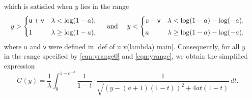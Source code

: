 \documentclass{amsart}
\theoremstyle{plain}
\theoremstyle{remark}
\numberwithin{equation}{section}
\begin{document}
which is satisfied when $y$ lies in the range
\begin{equation}\label{eqn:yrange}
    y>
    \begin{cases}
        \mathsf u+\mathsf v &\lambda<\log(1-a), 
        \smallskip 
        \\    
        1&\lambda\geq\log(1-a), 
    \end{cases} \quad \textup{ and } \quad  y<
    \begin{cases}
        \mathsf u- \mathsf v&\lambda<\log(1-a)-\log(-a), 
          \smallskip 
        \\
        a&\lambda\geq \log(1-a)-\log(-a), 
    \end{cases} 
\end{equation} 
where $\mathsf{u}$ and $\mathsf v$ were defined in \eqref{def of u v(lambda) main}. 
Consequently, for all \( y \) in the range specified by \eqref{eqn:yrange0} and \eqref{eqn:yrange}, we obtain the simplified expression
\begin{equation}
    G(y) = \frac{1}{\lambda} \int_{0}^{1 - e^{-\lambda}} \frac{1}{1 - t} \cdot 
    \frac{1}{\sqrt{(y - (a+1)(1 - t))^2 + 4a t(1 - t)}} \, dt.
\end{equation}
 
\end{document}
